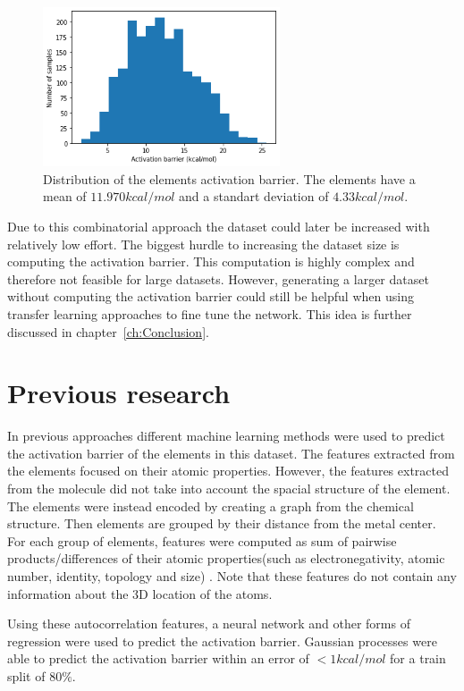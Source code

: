\begin{figure}[H]
  \centering
  \includegraphics[width=7cm]{figures/introduction/barrier.png}
  \caption[Distribution of activation barriers]{Distribution of the elements activation barrier. The elements have a mean of $11.970 kcal/mol$ and a standart deviation of $4.33 kcal/mol$.}
  \label{fig:barriers}
\end{figure}

Due to this combinatorial approach the dataset could later be increased with relatively low effort.
The biggest hurdle to increasing the dataset size is computing the activation barrier.
This computation is highly complex and therefore not feasible for large datasets.
However, generating a larger dataset without computing the activation barrier could still be helpful when using transfer learning approaches to fine tune the network.
This idea is further discussed in chapter~\ref{ch:Conclusion}.


\section{Previous research}

In previous approaches different machine learning methods were used to predict the activation barrier of the elements in this dataset.
The features extracted from the elements focused on their atomic properties.
However, the features extracted from the molecule did not take into account the spacial structure of the element.
The elements were instead encoded by creating a graph from the chemical structure.
Then elements are grouped by their distance from the metal center.
For each group of elements, features were computed as sum of pairwise products/differences of their atomic properties(such as electronegativity, atomic number, identity, topology and size) \cite{friederich_dos}.
Note that these features do not contain any information about the 3D location of the atoms.


Using these autocorrelation features, a neural network and other forms of regression were used to predict the activation barrier.
Gaussian processes were able to predict the activation barrier within an error of $<1 kcal/mol$ for a train split of $80\%$.

